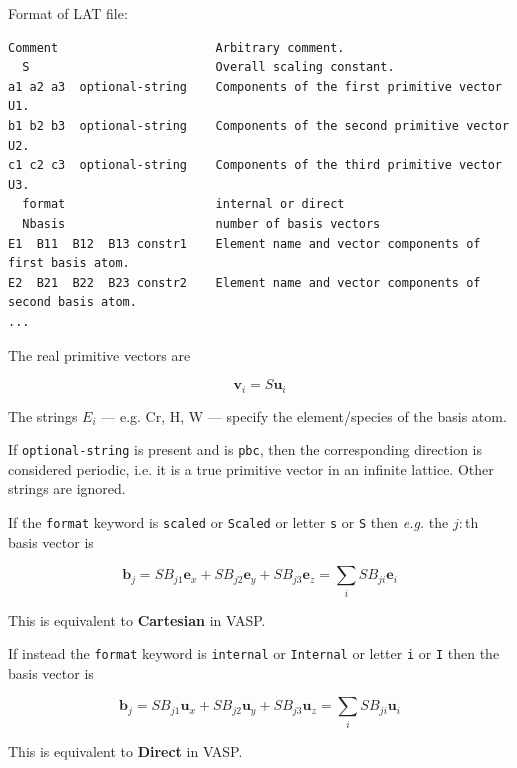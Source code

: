 \documentclass[a4paper,12pt,pdftex,onecolumn]{article}
\newcommand{\eg}{\emph{e.g.}\xspace}
\begin{document}
Format of LAT file:

\begin{Verbatim}[fontsize=\relsize{-1},frame=single]
Comment                      Arbitrary comment.
  S                          Overall scaling constant.
a1 a2 a3  optional-string    Components of the first primitive vector U1.
b1 b2 b3  optional-string    Components of the second primitive vector U2.
c1 c2 c3  optional-string    Components of the third primitive vector U3.
  format                     internal or direct
  Nbasis                     number of basis vectors
E1  B11  B12  B13 constr1    Element name and vector components of first basis atom.
E2  B21  B22  B23 constr2    Element name and vector components of second basis atom.
...
\end{Verbatim}

The real primitive vectors are

\begin{equation}
\mathbf{v}_i = S \mathbf{u}_i
\end{equation}

The strings $E_i$ --- e.g. Cr, H, W --- specify the element/species of the basis atom.

If \verb+optional-string+ is present and is \verb+pbc+, then
the corresponding direction is
considered periodic, i.e. it is a true primitive vector
in an infinite lattice. Other strings are ignored.

If the \verb+format+ keyword is \verb+scaled+ or \verb+Scaled+ or
letter \verb+s+ or \verb+S+ then \eg the $j:$th basis vector is

\begin{equation}
\mathbf{b}_j = S B_{j1} \mathbf{e}_x
+ S B_{j2} \mathbf{e}_y
+ S B_{j3} \mathbf{e}_z
= \sum_i S B_{ji} \mathbf{e}_i
\end{equation}

This is equivalent to \textbf{Cartesian} in VASP.

If instead the \verb+format+ keyword is \verb+internal+ or \verb+Internal+
or letter \verb+i+ or \verb+I+ then the basis vector is

\begin{equation}
\mathbf{b}_j = S B_{j1} \mathbf{u}_x
+ S B_{j2} \mathbf{u}_y
+ S B_{j3} \mathbf{u}_z
= \sum_i S B_{ji} \mathbf{u}_i
\end{equation}

This is equivalent to \textbf{Direct} in VASP.
\end{document}
